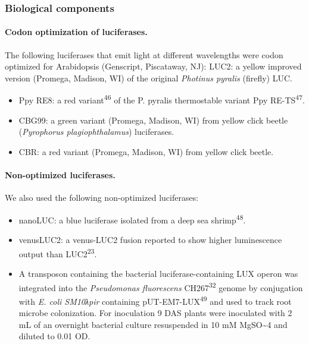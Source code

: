 \documentclass[]{article}
\begin{document}
\subsubsection{Biological components}\label{biological-components}

\paragraph{Codon optimization of
luciferases.}\label{codon-optimization-of-luciferases.}

The following luciferases that emit light at different wavelengths were
codon optimized for Arabidopsis (Genscript, Piscataway, NJ): LUC2: a
yellow improved version (Promega, Madison, WI) of the original
\emph{Photinus pyralis} (firefly) LUC.

\begin{itemize}
\item
  Ppy RE8: a red variant\textsuperscript{46} of the P. pyralis
  thermostable variant Ppy RE-TS\textsuperscript{47}.
\item
  CBG99: a green variant (Promega, Madison, WI) from yellow click beetle
  (\emph{Pyrophorus plagiophthalamus}) luciferases.
\item
  CBR: a red variant (Promega, Madison, WI) from yellow click beetle.
\end{itemize}

\paragraph{Non-optimized luciferases.}\label{non-optimized-luciferases.}

We also used the following non-optimized luciferases:

\begin{itemize}
\item
  nanoLUC: a blue luciferase isolated from a deep sea
  shrimp\textsuperscript{48}.
\item
  venusLUC2: a venus-LUC2 fusion reported to show higher luminescence
  output than LUC2\textsuperscript{23}.
\item
  A transposon containing the bacterial luciferase-containing LUX operon
  was integrated into the \emph{Pseudomonas fluorescens}
  CH267\textsuperscript{32} genome by conjugation with \emph{E. coli
  SM10λpir} containing pUT-EM7-LUX\textsuperscript{49} and used to track
  root microbe colonization. For inoculation 9 DAS plants were
  inoculated with 2 mL of an overnight bacterial culture resuspended in
  10 mM MgSO\textasciitilde{}4 and diluted to 0.01 OD.
\end{itemize}
\end{document}
